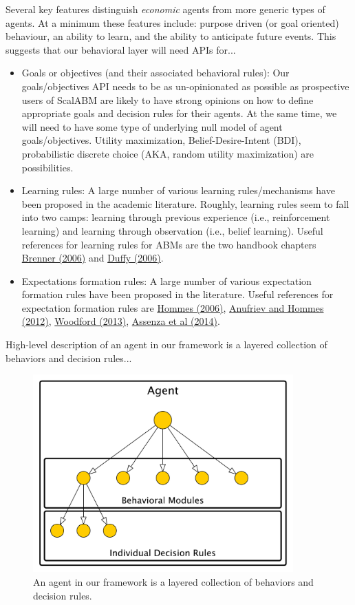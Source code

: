 \documentclass[11pt]{amsart}
\begin{document}
Several key features distinguish \textit{economic} agents from more generic types of agents. At a minimum these features include: purpose driven (or goal oriented) behaviour, an ability to learn, and the ability to anticipate future events. This suggests that our behavioral layer will need APIs for...
\begin{itemize}
    \item Goals or objectives (and their associated behavioral rules): Our goals/objectives API needs to be as un-opinionated as possible as prospective users of ScalABM are likely to have strong opinions on how to define appropriate goals and decision rules for their agents. At the same time, we will need to have some type of underlying null model of agent goals/objectives. Utility maximization, Belief-Desire-Intent (BDI), probabilistic discrete choice (AKA, random utility maximization) are possibilities.
    \item Learning rules: A large number of various learning rules/mechanisms have been proposed in the academic literature. Roughly, learning rules seem to fall into two camps: learning through previous experience (i.e., reinforcement learning) and learning through observation (i.e., belief learning). Useful references for learning rules for ABMs are the two handbook chapters \href{http://web.uvic.ca/~mingkang/econ353/project/Brenner.pdf}{Brenner (2006)} and \href{http://www.socsci.uci.edu/~duffy/papers/duffy2006.pdf}{Duffy (2006)}.
    \item Expectations formation rules: A large number of various expectation formation rules have been proposed in the literature. Useful references for expectation formation rules are \href{http://feb.kuleuven.be/fac/Slides_Degrauwe/HomHBchapter23.pdf}{Hommes (2006)}, \href{http://econ.columbia.edu/files/econ/content/hommes_background_material_2.pdf}{Anufriev and Hommes (2012)}, \href{http://www.columbia.edu/~mw2230/AREcon.pdf}{Woodford (2013)}, \href{http://www.emeraldinsight.com/doi/pdfplus/10.1108/S0193-230620140000017002}{Assenza et al (2014)}.
\end{itemize}

High-level description of an agent in our framework is a layered collection of behaviors and decision rules...
\begin{figure}[H]
\centering
\includegraphics[width=10cm]{img/hierarchical-actor.pdf}
\caption{An agent in our framework is a layered collection of behaviors and decision rules.}
\end{figure}
\end{document}

